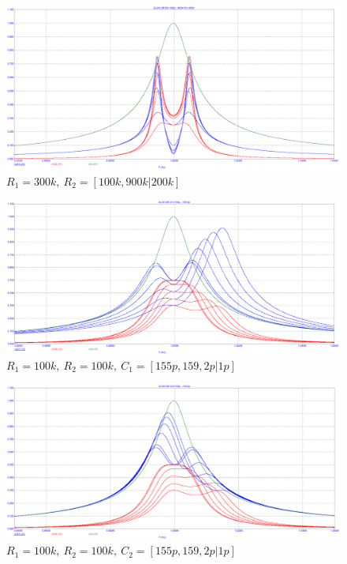 \documentclass[a4paper, 14pt]{article}%
\begin{document}
\begin{enumerate}
\begin{figure}[h!]
\centering
\includegraphics[scale = 0.4]{images/plot2_4.png}
\caption{$R_1 = 300k, \: R_2 = [100k, 900k|200k]$}
\label{fig:Image1}
\end{figure}

\newpage

\begin{figure}[h!]
\centering
\includegraphics[scale = 0.4]{images/plot2_5.png}
\caption{$R_1 = 100k, \: R_2 = 100k, \: C_1 = [155p, 159,2p | 1p]$}
\label{fig:Image1}
\end{figure}

\begin{figure}[h!]
\centering
\includegraphics[scale = 0.4]{images/plot2_6.png}
\caption{$R_1 = 100k, \: R_2 = 100k, \: C_2 = [155p, 159,2p | 1p]$}
\label{fig:Image1}
\end{figure}


\end{enumerate}
\end{document}
